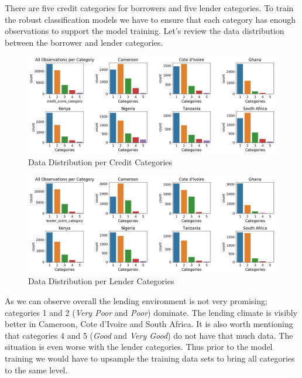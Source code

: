 There are five credit categories for borrowers and five lender
categories. To train the robust classification models we have to ensure
that each category has enough observations to support the model
training. Let's review the data distribution between the borrower and
lender categories.

\begin{Schunk}
\begin{figure}[H]

{\centering \includegraphics[width=1.15\linewidth]{../../artifacts/bcategories} 

}

\caption[Data Distribution per Credit Categories]{Data Distribution per Credit Categories}\label{fig:dc}
\end{figure}
\end{Schunk}

\begin{Schunk}
\begin{figure}[H]

{\centering \includegraphics[width=1.15\linewidth]{../../artifacts/lcategories} 

}

\caption[Data Distribution per Lender Categories]{Data Distribution per Lender Categories}\label{fig:dl}
\end{figure}
\end{Schunk}

As we can observe overall the lending environment is not very promising;
categories 1 and 2 (\emph{Very Poor} and \emph{Poor}) dominate. The
lending climate is visibly better in Cameroon, Cote d'Ivoire and South
Africa. It is also worth mentioning that categories 4 and 5 (\emph{Good}
and \emph{Very Good}) do not have that much data. The situation is even
worse with the lender categories. Thus prior to the model training we
would have to upsample the training data sets to bring all categories to
the same level.

